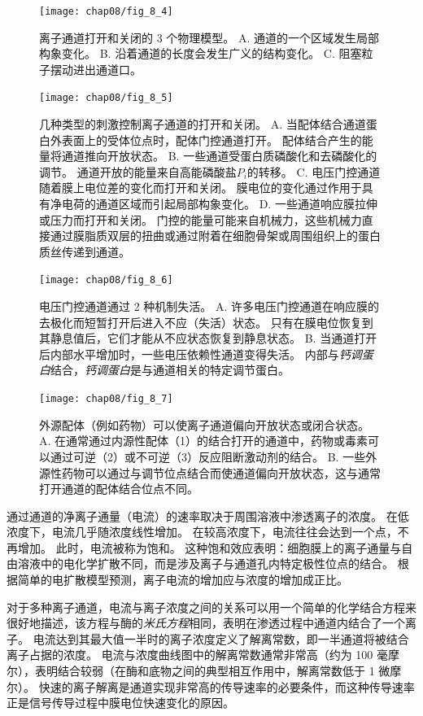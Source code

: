 \begin{figure}[htbp]
	\centering
	\texttt{[image: chap08/fig\_8\_4]}
	\caption{离子通道打开和关闭的 3 个物理模型。
		A. 通道的一个区域发生局部构象变化。
		B. 沿着通道的长度会发生广义的结构变化。
		C. 阻塞粒子摆动进出通道口。}
	\label{fig:8_4}
\end{figure}


\begin{figure}[htbp]
	\centering
	\texttt{[image: chap08/fig\_8\_5]}
	\caption{几种类型的刺激控制离子通道的打开和关闭。
		A. 当配体结合通道蛋白外表面上的受体位点时，配体门控通道打开。
		配体结合产生的能量将通道推向开放状态。
		B. 一些通道受蛋白质磷酸化和去磷酸化的调节。
		通道开放的能量来自高能磷酸盐$P_i$的转移。
		C. 电压门控通道随着膜上电位差的变化而打开和关闭。
		膜电位的变化通过作用于具有净电荷的通道区域而引起局部构象变化。
		D. 一些通道响应膜拉伸或压力而打开和关闭。
		门控的能量可能来自机械力，这些机械力直接通过膜脂质双层的扭曲或通过附着在细胞骨架或周围组织上的蛋白质丝传递到通道。}
	\label{fig:8_5}
\end{figure}


\begin{figure}[htbp]
	\centering
	\texttt{[image: chap08/fig\_8\_6]}
	\caption{电压门控通道通过 2 种机制失活。
		A. 许多电压门控通道在响应膜的去极化而短暂打开后进入不应（失活）状态。
		只有在膜电位恢复到其静息值后，它们才能从不应状态恢复到静息状态。
		B. 当通道打开后内部水平增加时，一些电压依赖性通道变得失活。
		内部与\textit{钙调蛋白}结合，\textit{钙调蛋白}是与通道相关的特定调节蛋白。}
	\label{fig:8_6}
\end{figure}


\begin{figure}[htbp]
	\centering
	\texttt{[image: chap08/fig\_8\_7]}
	\caption{外源配体（例如药物）可以使离子通道偏向开放状态或闭合状态。
		A. 在通常通过内源性配体（1）的结合打开的通道中，药物或毒素可以通过可逆（2）或不可逆（3）反应阻断激动剂的结合。
		B. 一些外源性药物可以通过与调节位点结合而使通道偏向开放状态，这与通常打开通道的配体结合位点不同。}
	\label{fig:8_7}
\end{figure}


通过通道的净离子通量（电流）的速率取决于周围溶液中渗透离子的浓度。
在低浓度下，电流几乎随浓度线性增加。
在较高浓度下，电流往往会达到一个点，不再增加。
此时，电流被称为饱和。
这种饱和效应表明：细胞膜上的离子通量与自由溶液中的电化学扩散不同，而是涉及离子与通道孔内特定极性位点的结合。
根据简单的电扩散模型预测，离子电流的增加应与浓度的增加成正比。


对于多种离子通道，电流与离子浓度之间的关系可以用一个简单的化学结合方程来很好地描述，该方程与酶的\textit{米氏方程}相同，表明在渗透过程中通道内结合了一个离子。
电流达到其最大值一半时的离子浓度定义了解离常数，即一半通道将被结合离子占据的浓度。
电流与浓度曲线图中的解离常数通常非常高（约为 100 毫摩尔），表明结合较弱（在酶和底物之间的典型相互作用中，解离常数低于 1 微摩尔）。
快速的离子解离是通道实现非常高的传导速率的必要条件，而这种传导速率正是信号传导过程中膜电位快速变化的原因。


